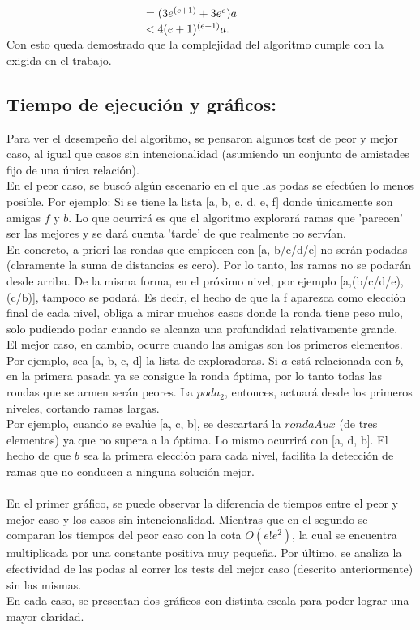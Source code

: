 \documentclass[10pt, a4paper]{article}
\begin{document}
$\hspace{43mm} = (3e^{(e+1)} + 3e^{e})a $\\

$\hspace{43mm} < 4(e+1)^{(e+1)}a.$\\


Con esto queda demostrado que la complejidad del algoritmo cumple con la exigida en el trabajo.

\subsection{Tiempo de ejecución y gráficos:}

Para ver el desempeño del algoritmo, se pensaron algunos test de peor y mejor caso, al igual que casos sin intencionalidad (asumiendo un conjunto de amistades fijo de una única relación).
\\En el peor caso, se buscó algún escenario en el que las podas se efectúen lo menos posible.
Por ejemplo: Si se tiene la lista [a, b, c, d, e, f] donde únicamente son amigas $f$ y $b$. Lo que ocurrirá es que el algoritmo explorará ramas que 'parecen' ser las mejores y se dará cuenta 'tarde' de que realmente no servían.
\\En concreto, a priori las rondas que empiecen con [a, b/c/d/e] no serán podadas (claramente la suma de distancias es cero). Por lo tanto, las ramas no se podarán desde arriba. De la misma forma, en el próximo nivel, por ejemplo [a,(b/c/d/e),(c/b)], tampoco se podará. Es decir, el hecho de que la f aparezca como elección final de cada nivel, obliga a mirar muchos casos donde la ronda tiene peso nulo, solo pudiendo podar cuando se alcanza una profundidad relativamente grande.\\

El mejor caso, en cambio, ocurre cuando las amigas son los primeros elementos. Por ejemplo, sea [a, b, c, d] la lista de exploradoras. Si $a$ está relacionada con $b$, en la primera pasada ya se consigue la ronda óptima, por lo tanto todas las rondas que se armen serán peores. La $poda_{2}$, entonces, actuará desde los primeros niveles, cortando ramas largas.
\\Por ejemplo, cuando se evalúe [a, c, b], se descartará la $rondaAux$ (de tres elementos) ya que no supera a la óptima. Lo mismo ocurrirá con [a, d, b]. El hecho de que $b$ sea la primera elección para cada nivel, facilita la detección de ramas que no conducen a ninguna solución mejor.\\
\\En el primer gráfico, se puede observar la diferencia de tiempos entre el peor y mejor caso y los casos sin intencionalidad. Mientras que en el segundo se comparan los tiempos del peor caso con la cota $O(e!e^2)$, la cual se encuentra multiplicada por una constante positiva muy pequeña. Por último, se analiza la efectividad de las podas al correr los tests del mejor caso (descrito anteriormente) sin las mismas.\\
En cada caso, se presentan dos gráficos con distinta escala para poder lograr una mayor claridad.
\end{document}
